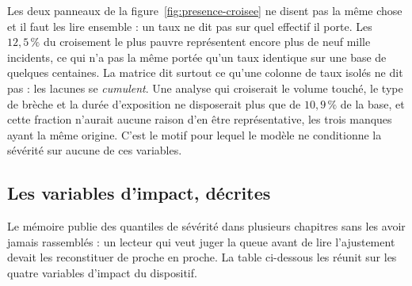 Les deux panneaux de la figure~\ref{fig:presence-croisee} ne disent pas la même chose et il faut
les lire ensemble : un taux ne dit pas sur quel effectif il porte. Les $12{,}5\,\%$ du croisement le plus pauvre représentent encore
plus de neuf mille incidents, ce qui n'a pas la même portée qu'un taux identique sur une base de
quelques centaines. La matrice dit surtout ce qu'une colonne de taux isolés ne dit pas : les
lacunes se \emph{cumulent}. Une analyse qui croiserait le volume touché, le type de brèche et la durée
d'exposition ne disposerait plus que de $10{,}9\,\%$ de la base, et cette fraction n'aurait aucune
raison d'en être représentative, les trois manques ayant la même origine. C'est le motif pour lequel le modèle ne conditionne la sévérité
sur aucune de ces variables.

\subsection{Les variables d'impact, décrites}
\label{subsec:describe-impact}

Le mémoire publie des quantiles de sévérité dans plusieurs chapitres sans les avoir jamais
rassemblés : un lecteur qui veut juger la queue avant de lire l'ajustement devait les
reconstituer de proche en proche. La table ci-dessous les réunit sur les quatre variables
d'impact du dispositif.

